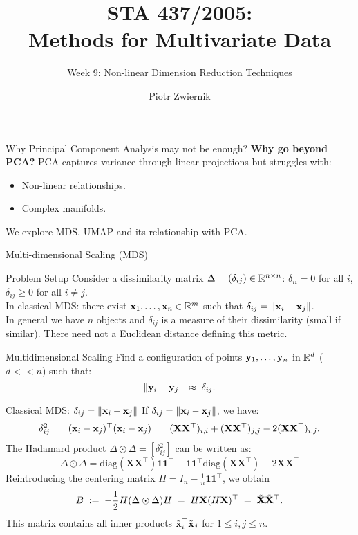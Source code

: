 \documentclass[11pt,handout,aspectratio=169]{beamer}
\title[STA437-Week1]{STA 437/2005: \\ Methods for Multivariate Data}
\subtitle[]{Week 9: Non-linear Dimension Reduction Techniques}
\author[Piotr Zwiernik]{Piotr Zwiernik}
\institute[UofT]{University of Toronto}
\date{}
\begin{document}
\maketitle


\begin{frame}{Why Principal Component Analysis may not be enough?}
  \textbf{Why go beyond PCA?} \newline
  PCA captures variance through linear projections but struggles with:
  \begin{itemize}
    \item Non-linear relationships.
    \item Complex manifolds.\\[6mm]
  \end{itemize}
  {We explore MDS, UMAP and its relationship with PCA.}
\end{frame}

\begin{frame}{}
	\begin{center}
		\alert{\Huge Multi-dimensional Scaling (MDS)}
	\end{center}
\end{frame}

\begin{frame}{Problem Setup}
Consider a \alert{dissimilarity} matrix $\Delta=(\delta_{ij})\in \mathbb R^{n\times n}$: $\delta_{ii}=0$ for all $i$, $\delta_{ij}\geq 0$ for all $i\neq j$. \\[5mm]

In classical MDS: there exist $\mathbf{x}_1,\ldots,\mathbf{x}_n\in \mathbb R^m$ such that $\delta_{ij}=\|\mathbf{x}_i-\mathbf{x}_j\|$.\\[5mm]
In general we have $n$ objects and $\delta_{ij}$ is a measure of their dissimilarity (small if similar). There need not a Euclidean distance defining this metric. 
\begin{alertblock}{Multidimensional Scaling}
	Find a configuration of points $\mathbf{y}_1,\ldots,\mathbf{y}_n$ in $\mathbb R^d$ ($d<\!\!<n$) such that:
	$$
	\|\mathbf{y}_i-\mathbf{y}_j\|\;\approx\;\delta_{ij}.
	$$ 
\end{alertblock}
\end{frame}

\begin{frame}{Classical MDS: $\delta_{ij}=\|\mathbf{x}_i-\mathbf{x}_j\|$}
If $\delta_{ij}=\|\mathbf{x}_i-\mathbf{x}_j\|$, we have:
\[\delta_{ij}^2 \;=\; (\mathbf{x}_i - \mathbf{x}_j)^{\top}(\mathbf{x}_i - \mathbf{x}_j)\;=\;(\mathbf{X}\mathbf{X}^\top)_{i,i}+(\mathbf{X}\mathbf{X}^\top)_{j,j}-2(\mathbf{X}\mathbf{X}^\top)_{i,j}.\]
The Hadamard product $\Delta\odot\Delta=[\delta_{ij}^2]$ can be written as:
	\[\Delta \odot \Delta = \mathrm{diag}(\mathbf{X}\mathbf{X}^{\top}) \mathbf{1} \mathbf{1}^{\top} + \mathbf{1} \mathbf{1}^{\top} \mathrm{diag}(\mathbf{X}\mathbf{X}^{\top}) - 2\mathbf{X}\mathbf{X}^{\top}\]
	Reintroducing the centering matrix $H = I_n - \frac{1}{n}\mathbf{1}\mathbf{1}^{\top}$, we obtain
	\[B \;:=\; -\frac{1}{2} H (\Delta \odot \Delta) H\;=\;H\mathbf{X} (H\mathbf{X})^\top \;=\;\tilde{\mathbf{X}}\tilde{\mathbf{X}}^\top.\]
	This matrix contains all inner products $\tilde{\mathbf{x}}_i^\top\tilde{\mathbf{x}}_j$ for $1\leq i,j\leq n$.
\end{frame}
\end{document}
